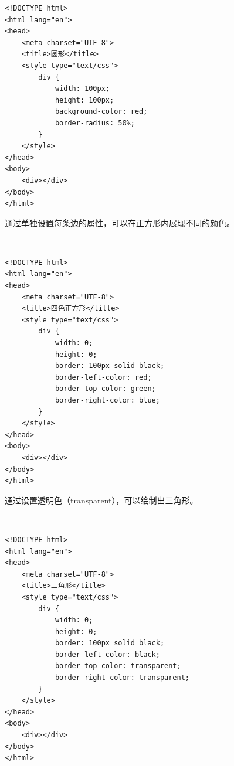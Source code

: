 \begin{lstlisting}[style=htmlcssjs]
<!DOCTYPE html>
<html lang="en">
<head>
    <meta charset="UTF-8">
    <title>圆形</title>
    <style type="text/css">
        div {
            width: 100px;
            height: 100px;
            background-color: red;
            border-radius: 50%;
        }
    </style>
</head>
<body>
    <div></div>
</body>
</html>
\end{lstlisting}

通过单独设置每条边的属性，可以在正方形内展现不同的颜色。

\begin{figure}[H]
	\centering
\end{figure}

 \\

\begin{lstlisting}[style=htmlcssjs]
<!DOCTYPE html>
<html lang="en">
<head>
    <meta charset="UTF-8">
    <title>四色正方形</title>
    <style type="text/css">
        div {
            width: 0;
            height: 0;
            border: 100px solid black;
            border-left-color: red;
            border-top-color: green;
            border-right-color: blue;
        }
    </style>
</head>
<body>
    <div></div>
</body>
</html>
\end{lstlisting}

通过设置透明色（transparent），可以绘制出三角形。

\begin{figure}[H]
	\centering
\end{figure}

 \\

\begin{lstlisting}[style=htmlcssjs]
<!DOCTYPE html>
<html lang="en">
<head>
    <meta charset="UTF-8">
    <title>三角形</title>
    <style type="text/css">
        div {
            width: 0;
            height: 0;
            border: 100px solid black;
            border-left-color: black;
            border-top-color: transparent;
            border-right-color: transparent;
        }
    </style>
</head>
<body>
    <div></div>
</body>
</html>
\end{lstlisting}


